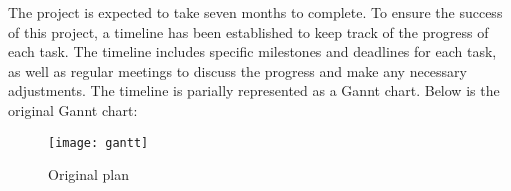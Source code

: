 The project is expected to take seven months to complete. To ensure the success of this project, a timeline has been established to keep track of the progress of each task. The timeline includes specific milestones and deadlines for each task, as well as regular meetings to discuss the progress and make any necessary adjustments. The timeline is parially represented as a Gannt chart. Below is the original Gannt chart:

\begin{figure}[htbp]
   \centerline{
   \texttt{[image: gantt]}}
   \caption{Original plan \cite{ref:spec-report}}
   \label{fig:gantt}
\end{figure}

\newpage